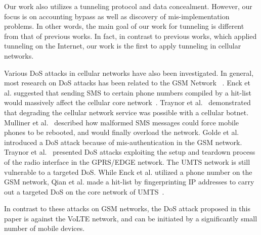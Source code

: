 Our work also utilizes a tunneling protocol and data concealment. However, our focus is on
accounting bypass as well as discovery of mis-implementation problems. In other
words, the main goal of our work for tunneling is different from that of previous works.
In fact, in contrast to previous works, which applied tunneling on the
Internet, our work is the first to apply tunneling in cellular
networks.

Various DoS attacks in cellular networks have also been
investigated.  In general, most research on DoS attacks has been
related to the GSM Network ~\cite{enck2005exploiting, traynor2009cellular,
  mulliner2011sms, qian2012you, golde2013let}.  Enck et al. suggested
that sending SMS to certain phone numbers compiled by a hit-list
would massively affect the cellular core
network~\cite{enck2005exploiting}.  Traynor
et al.~\cite{traynor2009cellular} demonstrated that degrading the cellular
network service was possible with a cellular botnet.  Mulliner
et al.~\cite{mulliner2011sms} described how malformed SMS messages could
force mobile phones to be rebooted, and would finally overload the
network.  Golde et al.~\cite{golde2013let} introduced a DoS attack
because of mis-authentication in the GSM network.
Traynor et al.~\cite{traynor2007attack} presented DoS attacks exploiting the setup
and teardown process of the radio interface in the GPRS/EDGE network.
The UMTS network is still vulnerable to a targeted DoS.  While Enck et al. utilized a
phone number on the GSM network, Qian et al. made a hit-list by
fingerprinting IP addresses to carry out a targeted DoS on the core
network of UMTS~\cite{qian2012you}.

In contrast to these attacks on GSM networks, the DoS attack proposed in
this paper is against the VoLTE network, and can be initiated by a
significantly small number of mobile devices.

